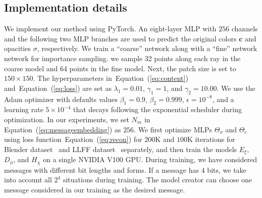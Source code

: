 \documentclass[10pt,twocolumn,letterpaper]{article}
\newcommand{\Eref}[1]{Equation~(\ref{#1})}
\def\loss{{\mathcal{L}}}
\begin{document}
\subsection{Implementation details}
We implement our method using PyTorch. An eight-layer MLP with $256$ channels and the following two MLP branches are used to predict the original colors $\mathbf{c}$ and opacities $\sigma$, respectively. We train a ``coarse'' network along with a ``fine'' network network for importance sampling. we sample 32 points along each ray in the coarse model and 64 points in the fine model. Next, the patch size is set to $150\times 150$. The hyperparameters in~\Eref{eq:content} and~\Eref{eq:loss} are set as $\lambda_1=0.01$, $\gamma_1=1$, and $\gamma_2=10.00$. We use the Adam optimizer with defaults values $\beta_1 = 0.9$, $\beta_2 = 0.999$, $\epsilon = 10^{-8}$, and a learning rate $5\times10^{-4}$ that decays following the exponential scheduler during optimization. In our experiments, we set $N_m$ in \Eref{eq:messageembedding} as  $256$. We first optimize MLPs $\Theta_{\sigma}$ and $\Theta_{c}$ using loss function~\Eref{eq:recon} for $200$K and $100$K iterations for Blender dataset~\cite{nerf2020} and LLFF dataset~\cite{mildenhall2019local} separately, and then train the models $E_\xi$, $D_\phi$, and $H_\chi$ on a single NVIDIA V100 GPU. During training, we have considered messages with different bit lengths and forms. If a message has $4$ bits, we take into account all $2^{4}$ situations during training. The model creator can choose one message considered in our training as the desired message.



\end{document}
